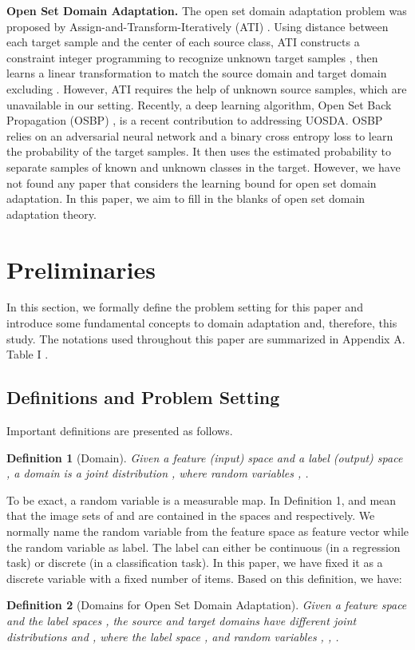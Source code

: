 \documentclass[journal]{IEEEtran}
\newtheorem{Definition}{Definition}
\begin{document}
\textbf{Open Set Domain Adaptation.} The open set domain adaptation problem was proposed by Assign-and-Transform-Iteratively (ATI) \cite{DBLP:conf/iccv/BustoG17}. Using  distance between each target sample and the center of each source class, ATI constructs a constraint integer programming to recognize unknown target samples , then learns a linear transformation to match the source domain and  target domain excluding . However, ATI requires the help of unknown source samples, which are unavailable in our setting. Recently, a deep learning algorithm, Open Set Back Propagation (OSBP) \cite{DBLP:conf/eccv/SaitoYUH18}, is a recent contribution to addressing UOSDA. OSBP relies on an adversarial neural network and a binary cross entropy loss to learn the probability of the target samples. It then uses the estimated probability to separate samples of known and unknown classes in the target. However, we have not found any paper that considers the learning bound for open set domain adaptation. In this paper, we aim to fill in the blanks of open set domain adaptation theory.
 \section{ {Preliminaries}}
In this section, we formally define the problem setting for this paper and introduce some fundamental concepts to domain adaptation and, therefore, this study. The notations used throughout this paper are summarized in Appendix A. Table I .

\subsection{Definitions and Problem Setting}

 Important definitions are presented as follows.
\begin{Definition}[{Domain}]\label{d2} Given a feature (input) space  and a label (output) space , a \textit{domain} is a joint distribution , where random variables , .
\end{Definition}

To be exact, a random variable is a measurable map. In Definition 1,  and   mean that the image sets of  and  are contained in the spaces  and  respectively.
We normally name the random variable  from the feature space  as feature vector while the random variable  as label. The label  can either be continuous (in a regression task) or discrete (in a classification task). In this paper, we have fixed it as a discrete variable with a fixed number of items. Based on this definition, we have:
\begin{Definition}[{Domains for Open Set Domain Adaptation}]\label{d3}Given a feature space  and the label spaces , the {source} and {target domains} have different joint distributions  and , where the label space , and  random variables , , .
\end{Definition}
\end{document}
